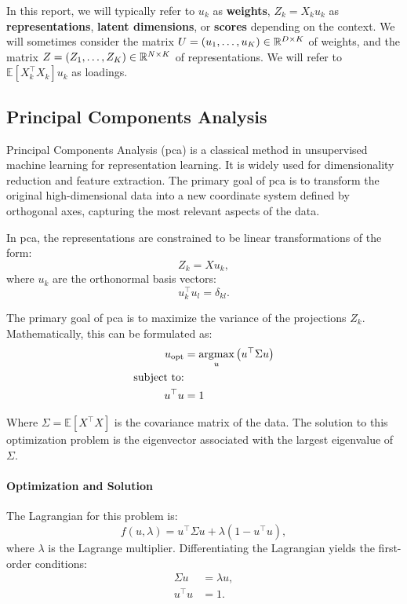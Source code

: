 In this report, we will typically refer to $u_k$ as \textbf{\gls{weights}}, $Z_k = X_k u_k$ as \textbf{representations},
\textbf{latent
    dimensions}, or \textbf{scores} depending on the context. We will sometimes consider the
matrix $U = \left(u_1, \dots, u_K\right) \in \mathbb{R}^{D \times K}$ of \gls{weights}, and the
matrix $Z = \left(Z_1, \dots, Z_K\right) \in \mathbb{R}^{N \times K}$ of representations. We will refer to $\mathbb{E
    }[X_k^\top X_k] u_k$ as loadings.

\subsection{Principal Components Analysis}

Principal Components Analysis\cite{hotelling1933analysis} (\acrshort{pca}) is a classical method in unsupervised machine learning for representation learning.
It is widely used for dimensionality reduction and feature extraction.
The primary goal of \acrshort{pca} is to transform the original high-dimensional data into a new coordinate system defined by orthogonal axes, capturing the most relevant aspects of the data.

In \acrshort{pca}, the representations are constrained to be linear transformations of the form:
\begin{equation}\label{eq:pca-linear-function-def}
    Z_k = X u_k,
\end{equation}
where $u_k$ are the orthonormal basis vectors:
\begin{equation}\label{eq:pca-orthonormality-constraint}
    u_k^\top u_l = \delta_{kl}.
\end{equation}

The primary goal of \acrshort{pca} is to maximize the variance of the projections \(Z_k\). Mathematically, this can be formulated
as:
\begin{align}
    u_{\text{opt}} & = \underset{u}{\text{argmax}} \left( u^\top \Sigma u \right) \\
    \text{subject to:} \notag                                                     \\
    u^\top u       & = 1 \notag
\end{align}

Where \(\Sigma = \mathbb{E}[X^\top X]\) is the covariance matrix of the data. The solution to this optimization problem is the eigenvector associated with the largest eigenvalue of \(\Sigma\).

\paragraph{Optimization and Solution}
The Lagrangian for this problem is:
\begin{equation}
    f(u,\lambda) = u^\top \Sigma u + \lambda(1 - u^\top u),
\end{equation}
where \(\lambda\) is the Lagrange multiplier. Differentiating the Lagrangian yields the first-order conditions:
\begin{align}
    \Sigma u & = \lambda u, \\
    u^\top u & = 1.
\end{align}


